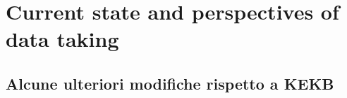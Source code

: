 \newpage




\section{Current state and perspectives of data taking}












\subsection{Alcune ulteriori modifiche rispetto a KEKB}


